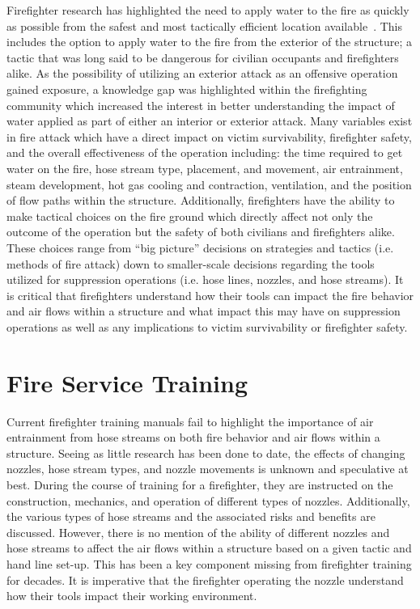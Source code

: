 \documentclass[12pt,oneside]{book}
\begin{document}
Firefighter research has highlighted the need to apply water to the fire as quickly as possible from the safest and most tactically efficient location available~\cite{DHS2008,DHS2010,DHS2011}. This includes the option to apply water to the fire from the exterior of the structure; a tactic that was long said to be dangerous for civilian occupants and firefighters alike. As the possibility of utilizing an exterior attack as an offensive operation gained exposure, a knowledge gap was highlighted within the firefighting community which increased the interest in better understanding the impact of water applied as part of either an interior or exterior attack. Many variables exist in fire attack which have a direct impact on victim survivability, firefighter safety, and the overall effectiveness of the operation including: the time required to get water on the fire, hose stream type, placement, and movement, air entrainment, steam development, hot gas cooling and contraction, ventilation, and the position of flow paths within the structure. Additionally, firefighters have the ability to make tactical choices on the fire ground which directly affect not only the outcome of the operation but the safety of both civilians and firefighters alike. These choices range from ``big picture'' decisions on strategies and tactics (i.e. methods of fire attack) down to smaller-scale decisions regarding the tools utilized for suppression operations (i.e. hose lines, nozzles, and hose streams). It is critical that firefighters understand how their tools can impact the fire behavior and air flows within a structure and what impact this may have on suppression operations as well as any implications to victim survivability or firefighter safety.

\section*{Fire Service Training}

Current firefighter training manuals fail to highlight the importance of air entrainment from hose streams on both fire behavior and air flows within a structure. Seeing as little research has been done to date, the effects of changing nozzles, hose stream types, and nozzle movements is unknown and speculative at best. During the course of training for a firefighter, they are instructed on the construction, mechanics, and operation of different types of nozzles. Additionally, the various types of hose streams and the associated risks and benefits are discussed. However, there is no mention of the ability of different nozzles and hose streams to affect the air flows within a structure based on a given tactic and hand line set-up. This has been a key component missing from firefighter training for decades. It is imperative that the firefighter operating the nozzle understand how their tools impact their working environment. 
\end{document}

